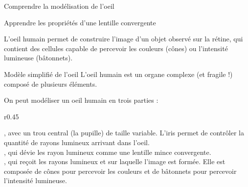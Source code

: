 \sndEnTeteQuatre
\vspace*{-32pt}



\vspace*{-12pt}
\begin{objectifs}
  \item Comprendre la modélisation de l'oeil
  \item Apprendre les propriétés d'une lentille convergente
\end{objectifs}

\begin{contexte}
  L'oeil humain permet de construire l'image d'un objet observé sur la rétine, qui contient des cellules capable de percevoir les couleurs (cônes) ou l'intensité lumineuse (bâtonnets).
  
\end{contexte}


\begin{doc}{Modèle simplifié de l'oeil}
  \label{doc:modele_oeil}
  L'oeil humain est un organe complexe (et fragile !) composé de plusieurs éléments.
 
  On peut modéliser un oeil humain en trois parties :
  
  \begin{wrapfigure}[8]{r}{0.45\linewidth}
    \centering
    \vspace*{-12pt}
  \end{wrapfigure}
  \pointCyan {}, avec un trou central (la pupille) de taille variable. L'iris permet de contrôler la quantité de rayons lumineux arrivant dans l'oeil. \\
  \pointCyan {}, qui dévie les rayon lumineux comme une lentille mince convergente. \\
  \pointCyan {}, qui reçoit les rayons lumineux et sur laquelle l'image est formée.
  Elle est composée de cônes pour percevoir les couleurs et de bâtonnets pour percevoir l'intensité lumineuse.
\end{doc}

